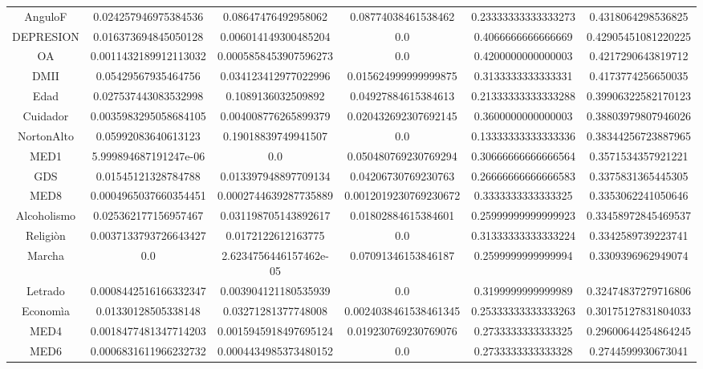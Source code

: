 \documentclass[11pt]{article}
\begin{document}
\begin{table}
\begin{tabular}{|c|SSSSS|}
AnguloF & 0.024257946975384536 & 0.08647476492958062 & 0.08774038461538462 & 0.23333333333333273 & 0.4318064298536825\\
DEPRESION & 0.016373694845050128 & 0.006014149300485204 & 0.0 & 0.4066666666666669 & 0.42905451081220225\\ 
OA & 0.0011432189912113032 & 0.0005858453907596273 & 0.0 & 0.4200000000000003 & 0.4217290643819712\\ 
DMII & 0.05429567935464756 & 0.034123412977022996 & 0.015624999999999875 & 0.3133333333333331 & 0.4173774256650035\\ 
Edad & 0.027537443083532998 & 0.1089136032509892 & 0.04927884615384613 & 0.21333333333333288 & 0.39906322582170123\\ 
Cuidador & 0.0035983295058684105 & 0.004008776265899379 & 0.020432692307692145 & 0.3600000000000003 & 0.38803979807946026\\ 
NortonAlto & 0.05992083640613123 & 0.19018839749941507 & 0.0 & 0.13333333333333336 & 0.38344256723887965\\ 
MED1 &5.999894687191247e-06 & 0.0 & 0.050480769230769294 & 0.30666666666666564 & 0.3571534357921221\\
GDS & 0.01545121328784788 & 0.013397948897709134 & 0.04206730769230763 & 0.26666666666666583 & 0.3375831365445305\\
MED8 & 0.0004965037660354451 & 0.0002744639287735889 & 0.0012019230769230672 & 0.3333333333333325 & 0.3353062241050646\\
Alcoholismo & 0.025362177156957467 & 0.031198705143892617 & 0.01802884615384601 & 0.25999999999999923 & 0.33458972845469537\\
Religiòn & 0.0037133793726643427 & 0.0172122612163775 & 0.0 & 0.31333333333333224 & 0.3342589739223741\\
Marcha & 0.0 & 2.6234756446157462e-05& 0.07091346153846187 & 0.2599999999999994 & 0.3309396962949074\\
Letrado & 0.0008442516166332347 & 0.003904121180535939 & 0.0 & 0.3199999999999989 & 0.32474837279716806\\
Economìa & 0.01330128505338148 & 0.03271281377748008 & 0.0024038461538461345 & 0.25333333333333263 & 0.30175127831804033\\
MED4 &0.0018477481347714203  & 0.0015945918497695124 & 0.019230769230769076 & 0.2733333333333325 & 0.29600644254864245\\
MED6 & 0.0006831611966232732 & 0.0004434985373480152 & 0.0 & 0.2733333333333328 & 0.2744599930673041\\

\end{tabular}
\end{table}
\end{document}
